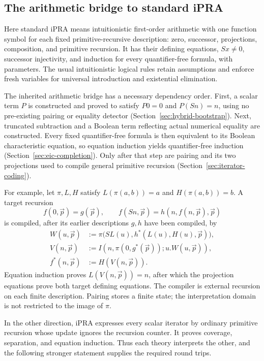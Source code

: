 \documentclass[11pt,letterpaper]{article}
\theoremstyle{definition}
\theoremstyle{remark}
\begin{document}
\subsection{The arithmetic bridge to standard iPRA}

Here standard iPRA means intuitionistic first-order arithmetic with one
function symbol for each fixed primitive-recursive description: zero,
successor, projections, composition, and primitive recursion. It has their
defining equations, $Sx\ne0$, successor injectivity, and induction for every
quantifier-free formula, with parameters. The usual intuitionistic logical
rules retain assumptions and enforce fresh variables for universal
introduction and existential elimination.

The inherited arithmetic bridge has a necessary dependency order.
First, a scalar term $P$ is constructed and proved to satisfy
$P0=0$ and $P(Sn)=n$, using no pre-existing pairing or equality detector
(Section~\ref{sec:hybrid-bootstrap}). Next, truncated subtraction and a
Boolean term reflecting actual numerical equality are constructed.
Every fixed quantifier-free formula is then equivalent to its Boolean
characteristic equation, so equation induction yields quantifier-free
induction (Section~\ref{sec:eic-completion}). Only after that step are pairing
and its two projections used to compile general primitive recursion
(Section~\ref{sec:iterator-coding}).

For example, let $\pi,L,H$ satisfy
$L(\pi(a,b))=a$ and $H(\pi(a,b))=b$. A target recursion
\[
 f(0,\vec p)=g(\vec p),\qquad
 f(Sn,\vec p)=h(n,f(n,\vec p),\vec p)
\]
is compiled, after its earlier descriptions $g,h$ have been compiled, by
\[
 \begin{aligned}
 W(u,\vec p)&:=
   \pi\bigl(SL(u),h^*(L(u),H(u),\vec p)\bigr),\\
 V(n,\vec p)&:=I(n,\pi(0,g^*(\vec p));u.W(u,\vec p)),\\
 f^*(n,\vec p)&:=H(V(n,\vec p)).
 \end{aligned}
\]
Equation induction proves $L(V(n,\vec p))=n$, after which the projection
equations prove both target defining equations. The compiler is external
recursion on each finite description. Pairing stores a finite state; the
interpretation domain is not restricted to the image of $\pi$.

In the other direction, iPRA expresses every scalar iterator by ordinary
primitive recursion whose update ignores the recursion counter. It proves
coverage, separation, and equation induction. Thus each theory interprets
the other, and the following stronger statement supplies the required
round trips.
\end{document}

